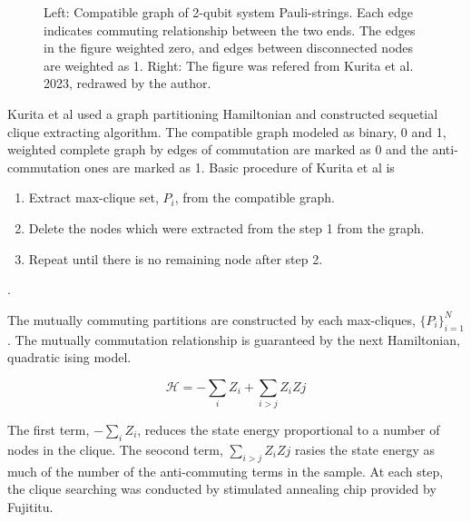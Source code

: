 \begin{figure}[ht]
    \centering
    \scalebox{0.7}{
        
        
        }
    \caption{
        Left: Compatible graph of 2-qubit system Pauli-strings. 
        Each edge indicates commuting relationship between the two ends.
        The edges in the figure weighted zero, and edges between disconnected nodes
        are weighted as 1.
        Right:
        The figure was refered from Kurita et al. 2023, redrawed by the author\cite{kurital_2023}.
    }
    \label{fig:compatible_graph_example_2qubits}
\end{figure}
%        

Kurita et al used a graph partitioning Hamiltonian and 
constructed sequetial clique extracting algorithm.
The compatible graph modeled as binary, 0 and 1, weighted 
complete graph by edges of commutation are marked as 0 
and the anti-commutation ones are marked as 1.
Basic procedure of Kurita et al is 

\begin{enumerate}
    \item Extract max-clique set, $P_i$, from the compatible graph.
    \item Delete the nodes which were extracted from the step 1 from the graph.
    \item Repeat until there is no remaining node after step 2.
\end{enumerate}.

The mutually commuting partitions are constructed 
by each max-cliques, $\{P_i\}_{i=1}^N$. 
The mutually commutation relationship is guaranteed by the next 
Hamiltonian, quadratic ising model.

\begin{equation}
    \mathcal{H} = -\sum_i Z_i + \sum_{i >j} Z_i Zj
\end{equation}

The first term, $-\sum_i Z_i$, reduces the state energy 
proportional to a number of nodes in the clique.
The seocond term, $\sum_{i >j} Z_i Zj$ rasies the state energy
as much of the number of the anti-commuting terms in the sample.
At each step, the clique searching was conducted by stimulated annealing chip provided by Fujititu. 


